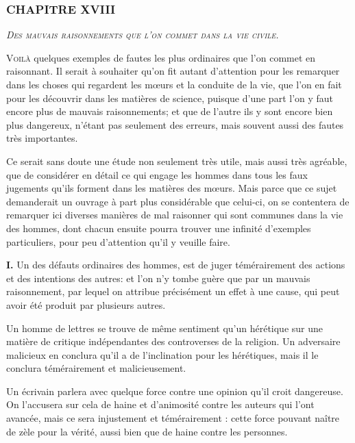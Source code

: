 \subsubsection{\centering \Large CHAPITRE XVIII}
\begin{center}\emph{\large\scshape Des mauvais raisonnements que l'on commet dans la vie civile.}\end{center}

	\lettrine{V}{oilà} quelques exemples de fautes les plus ordinaires que l'on commet en raisonnant. Il serait à souhaiter qu'on fit autant d'attention pour les remarquer dans les choses qui regardent les mœurs et la conduite de la vie, que l'on en fait pour les découvrir dans les matières de science, puisque d'une part l'on y faut encore plus de mauvais raisonnements; et que de l'autre ils y sont encore bien plus dangereux, n'étant pas seulement des erreurs, mais souvent aussi des fautes très importantes.

Ce serait sans doute une étude non seulement très utile, mais aussi très agréable, que de considérer en détail ce qui engage les hommes dans tous les faux jugements qu'ils forment dans les matières des mœurs. Mais parce que ce sujet demanderait un ouvrage à part plus considérable que celui-ci, on se contentera de remarquer ici diverses manières de mal raisonner qui sont communes dans la vie des hommes, dont chacun ensuite pourra trouver une infinité d'exemples particuliers, pour peu d'attention qu'il y veuille faire.

\bigbreak
{\bfseries\scshape I.} Un des défauts ordinaires des hommes, est de juger témérairement des actions et des intentions des autres: et l'on n'y tombe guère que par un mauvais raisonnement, par lequel on attribue précisément un effet à une cause, qui peut avoir été produit par plusieurs autres.

Un homme de lettres se trouve de même sentiment qu'un hérétique sur une matière de critique indépendantes des controverses de la religion. Un adversaire malicieux en conclura qu'il a de l'inclination pour les hérétiques, mais il le conclura témérairement et malicieusement.

Un écrivain parlera avec quelque force contre une opinion qu'il croit dangereuse. On l'accusera sur cela de haine et d'animosité contre les auteurs qui l'ont avancée, mais ce sera injustement et témérairement : cette force pouvant naître de zèle pour la vérité, aussi bien que de haine contre les personnes.

